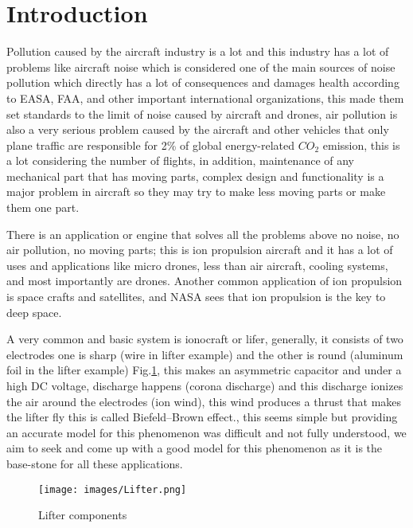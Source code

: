 \section*{Introduction}
\hspace{\parindent}Pollution caused by the aircraft industry is a lot and this industry
has a lot of problems like aircraft noise which is considered one of
the main sources of noise pollution\cite{SakrRef} %
which directly has a lot of consequences and damages health
according to EASA, FAA, and other important international 
organizations, this made them set standards to the limit of 
noise caused by aircraft and drones, 
air pollution is also a very serious problem caused by the aircraft
and other vehicles that only plane traffic are responsible for 2\% of global energy-related $CO_2$ emission, %
this is a lot considering the number of flights, in addition, maintenance
of any mechanical part that has moving parts, complex design and
functionality is a major problem in aircraft so they may try to make
less moving parts or make them one part.\cite{SakrRef}

There is an application or engine that solves all the problems above no noise, no air pollution, no moving parts; this is ion propulsion aircraft
and it has a lot of uses and applications like micro drones, less than air aircraft, cooling systems, and most importantly are drones.\cite{SakrRef} Another common application of ion propulsion is space crafts and satellites, and NASA sees that ion propulsion is the key to deep space.\cite{NASARef}

A very common and basic system is ionocraft or lifer, generally, it consists of two electrodes one is sharp (wire in lifter example)
and the other is round (aluminum foil in the lifter example)
Fig.\ref{Lifter}, this makes an asymmetric capacitor and  under a high DC voltage, discharge happens (corona discharge) and this discharge ionizes the air around 
the electrodes
(ion wind), this wind produces a thrust that makes the lifter fly this is called Biefeld–Brown effect.\cite{first}, this seems simple but
providing an accurate model for this phenomenon was difficult and not fully understood\cite{aerodynamicModels}, we aim to seek and come up
with a good model for this phenomenon as it is the base-stone for all these applications.
\begin{figure}[ht]
	\centering
	\texttt{[image: images/Lifter.png]}
  \caption{Lifter components\cite{first}}
	\label{Lifter}
\end{figure}
